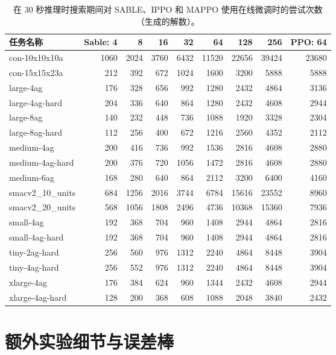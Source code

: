 \documentclass[11pt,UTF8,fontset=fandol]{ctexart}
\begin{document}
\begin{table}[H]\centering
\caption{在 30 秒推理时搜索期间对 SABLE、IPPO 和 MAPPO 使用在线微调时的尝试次数（生成的解数）。}
\label{tab:16}
\small
\begin{tabular}{lrrrrrrrr}
\toprule
任务名称 & Sable: 4 & 8 & 16 & 32 & 64 & 128 & 256 & PPO: 64\\
\midrule
con-10x10x10a & 1060 & 2024 & 3760 & 6432 & 11520 & 22656 & 39424 & 23680\\
con-15x15x23a & 212 & 392 & 672 & 1024 & 1600 & 3200 & 5888 & 5888\\
large-4ag & 176 & 328 & 656 & 992 & 1280 & 2432 & 4864 & 3136\\
large-4ag-hard & 204 & 336 & 640 & 864 & 1280 & 2432 & 4608 & 2944\\
large-8ag & 140 & 232 & 448 & 736 & 1088 & 1920 & 3328 & 2304\\
large-8ag-hard & 112 & 256 & 400 & 672 & 1216 & 2560 & 4352 & 2112\\
medium-4ag & 200 & 416 & 736 & 992 & 1536 & 2816 & 4608 & 2880\\
medium-4ag-hard & 200 & 376 & 720 & 1056 & 1472 & 2816 & 4608 & 2880\\
medium-6ag & 168 & 280 & 640 & 864 & 2112 & 3200 & 6400 & 4160\\
smacv2\_10\_units & 684 & 1256 & 2016 & 3744 & 6784 & 15616 & 23552 & 8960\\
smacv2\_20\_units & 568 & 1056 & 1808 & 2496 & 4736 & 10368 & 15360 & 7936\\
small-4ag & 192 & 368 & 704 & 960 & 1408 & 2944 & 4864 & 2816\\
small-4ag-hard & 192 & 368 & 704 & 960 & 1408 & 2944 & 4864 & 2816\\
tiny-2ag-hard & 256 & 560 & 976 & 1312 & 2240 & 4864 & 8448 & 3904\\
tiny-4ag-hard & 256 & 552 & 976 & 1312 & 2240 & 4864 & 8448 & 3904\\
xlarge-4ag & 176 & 384 & 624 & 960 & 1344 & 2432 & 4608 & 2944\\
xlarge-4ag-hard & 128 & 200 & 368 & 608 & 1088 & 2048 & 3840 & 2432\\
\bottomrule
\end{tabular}
\end{table}

\section{额外实验细节与误差棒}
\end{document}
